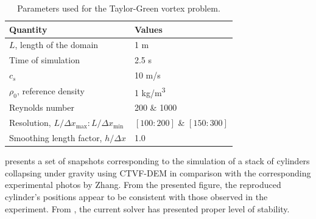 \documentclass[preprint,12pt]{elsarticle}
\begin{document}
\begin{table}[!ht]
  \centering
  \begin{tabular}[!ht]{ll}
    \toprule
    Quantity & Values\\
    \midrule
    $L$, length of the domain & 1 m \\
    Time of simulation & 2.5 s \\
    $c_s$ & 10 m/s \\
    $\rho_0$, reference density & 1 kg/m\textsuperscript{3} \\
    Reynolds number & 200 \& 1000 \\
    Resolution, $L/\Delta x_{\max} : L/\Delta x_{\min}$ & $[100:200]$ \& $[150:300]$\\
    Smoothing length factor, $h/\Delta x$ & 1.0\\
    \bottomrule
  \end{tabular}
  \caption{Parameters used for the Taylor-Green vortex problem.}%
  \label{tab:stack-of-cylinders}
\end{table}

 presents a set of snapshots
corresponding to the simulation of a stack of cylinders collapsing under
gravity using CTVF-DEM in comparison with the corresponding experimental
photos by Zhang. From the presented figure, the reproduced cylinder's
positions appear to be consistent with those observed in the experiment. From
, the current solver has presented
proper level of stability.
\end{document}
